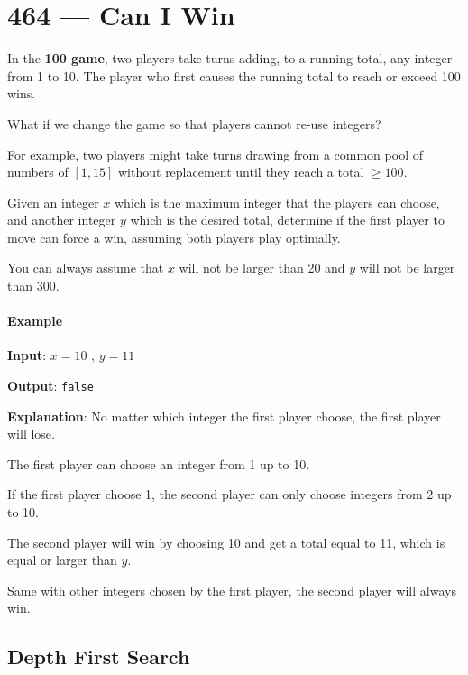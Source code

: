 \section{464 --- Can I Win}
In the \textbf{100 game}, two players take turns adding, to a running total, any integer from 1 to 10. The player who first causes the running total to reach or exceed 100 wins.

What if we change the game so that players cannot re-use integers?

For example, two players might take turns drawing from a common pool of numbers of $[1, 15]$ without replacement until they reach a total $\geq 100$.

Given an integer $x$ which is the maximum integer that the players can choose, and another integer $y$ which is the desired total, determine if the first player to move can force a win, assuming both players play optimally.

You can always assume that $x$ will not be larger than 20 and $y$ will not be larger than 300.

\paragraph{Example}

\begin{flushleft}
\textbf{Input}: $x = 10$ , $y = 11$

\textbf{Output}: \texttt{false}

\textbf{Explanation}: No matter which integer the first player choose, the first player will lose.

The first player can choose an integer from 1 up to 10.

If the first player choose 1, the second player can only choose integers from 2 up to 10.

The second player will win by choosing 10 and get a total equal to 11, which is equal or larger than $y$.

Same with other integers chosen by the first player, the second player will always win.
\end{flushleft}

\subsection{Depth First Search}

